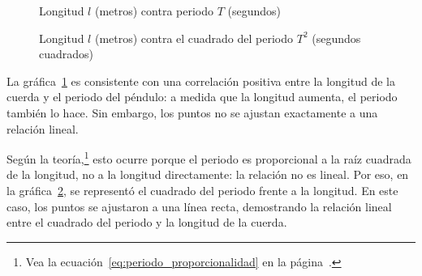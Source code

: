 \documentclass[twocolumn]{report}
\numberwithin{table}{section}
\begin{document}
\begin{figure}[ht]
  \centering
  \caption{Longitud $l$ (metros) contra periodo $T$
  (segundos)}\label{fig:longitud_periodo}
\end{figure}

\begin{figure}[ht]
  \centering
  \caption{Longitud $l$ (metros) contra el cuadrado del periodo $T^{2}$
  (segundos cuadrados)}\label{fig:longitud_cuadrado_periodo}
\end{figure}

La gráfica~\ref{fig:longitud_periodo} es consistente con una
correlación positiva entre la longitud de la cuerda y el periodo del
péndulo: a medida que la longitud aumenta, el periodo también lo hace. Sin
embargo, los puntos no se ajustan exactamente a una relación lineal.

Según la teoría,\footnote{Vea la
  ecuación~\eqref{eq:periodo_proporcionalidad} en la
página~\pageref{eq:periodo_proporcionalidad}.} esto ocurre porque el periodo es
proporcional a la raíz cuadrada de la longitud, no a la longitud
directamente: la relación no es lineal. Por eso, en la
gráfica~\ref{fig:longitud_cuadrado_periodo}, se representó el
cuadrado del periodo frente a la longitud. En este caso, los puntos
se ajustaron a una línea recta, demostrando la relación lineal entre
el cuadrado del periodo y la longitud de la cuerda.
\end{document}

